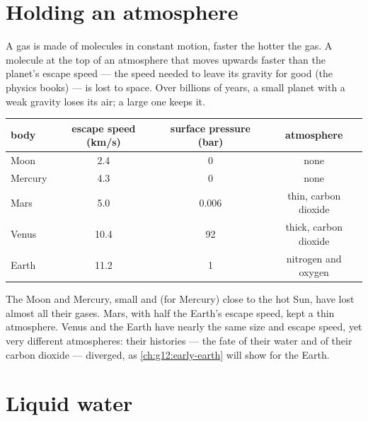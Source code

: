 \section{Holding an atmosphere}

A gas is made of molecules in constant motion, faster the hotter the gas.
A molecule at the top of an atmosphere that moves upwards faster than the
planet's escape speed --- the speed needed to leave its gravity for good
(the physics books) --- is lost to space. Over billions of years, a small
planet with a weak gravity loses its air; a large one keeps it.

\begin{center}
\small
\begin{tabular}{lccc}
\hline
body & escape speed (\unit{km/s}) & surface pressure (bar) & atmosphere \\
\hline
Moon & 2.4 & 0 & none \\
Mercury & 4.3 & 0 & none \\
Mars & 5.0 & 0.006 & thin, carbon dioxide \\
Venus & 10.4 & 92 & thick, carbon dioxide \\
Earth & 11.2 & 1 & nitrogen and oxygen \\
\hline
\end{tabular}
\end{center}

\begin{remark}\label{rem:g10:habitable-planet:size}
The Moon and Mercury, small and (for Mercury) close to the hot Sun, have
lost almost all their gases. Mars, with half the Earth's escape speed, kept a
thin atmosphere. Venus and the Earth have nearly the same size and escape
speed, yet very different atmospheres: their histories --- the fate of their
water and of their carbon dioxide --- diverged, as \cref{ch:g12:early-earth}
will show for the Earth.
\end{remark}

\section{Liquid water}

